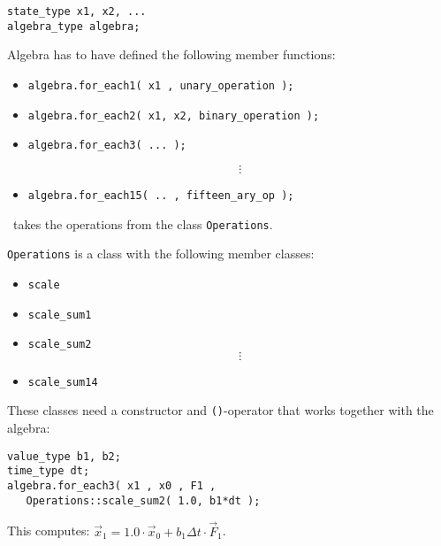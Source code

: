 \begin{frame}[fragile]

\begin{lstlisting}
state_type x1, x2, ...
algebra_type algebra;
\end{lstlisting}

Algebra has to have defined the following member functions:

\begin{itemize}
 \item \lstinline+algebra.for_each1( x1 , unary_operation );+
 \item \lstinline+algebra.for_each2( x1, x2, binary_operation );+
 \item \lstinline+algebra.for_each3( ... );+

\[\vdots\]

 \item \lstinline+algebra.for_each15( .. , fifteen_ary_op );+
\end{itemize}

\pause
\odeint\ takes the operations from the class \lstinline+Operations+.

\end{frame}

\begin{frame}[fragile]

\lstinline+Operations+ is a class with the following member classes:
\begin{itemize}
 \item \lstinline+scale+
 \item \lstinline+scale_sum1+
 \item \lstinline+scale_sum2+
\[ \vdots \]
 \item \lstinline+scale_sum14+
\end{itemize}

These classes need a constructor and \lstinline+()+-operator that works together with the algebra:
\begin{lstlisting}
value_type b1, b2;
time_type dt;
algebra.for_each3( x1 , x0 , F1 ,
   Operations::scale_sum2( 1.0, b1*dt );
\end{lstlisting}

This computes: $\vec x_1 = 1.0\cdot \vec x_0 + b_1\Delta t\cdot \vec F_1$.
\end{frame}


